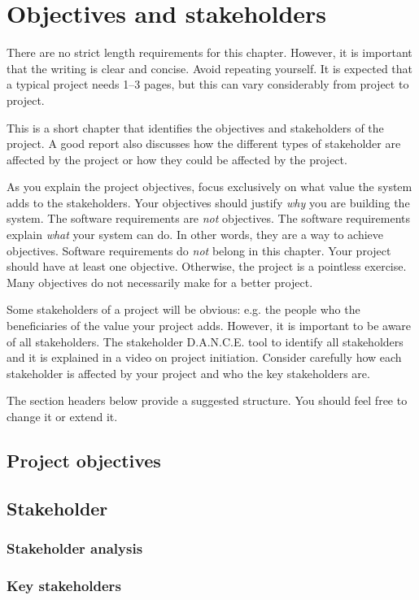 \chapter{Objectives and stakeholders}
\label{sect:objectives}


\begin{length}
There are no strict length requirements for this chapter.  However, it is important that the writing is clear and concise.  Avoid repeating yourself.  It is expected that a typical project needs 1--3 pages, but this can vary considerably from project to project.
\end{length}

\begin{expectations}
This is a short chapter that identifies the objectives and stakeholders of the project.  A good report also discusses how the different types of stakeholder are affected by the project or how they could be affected by the project.

As you explain the project objectives, focus exclusively on what value the system adds to the stakeholders.  Your objectives should justify \emph{why} you are building the system.  The software requirements are \emph{not} objectives.  The software requirements explain \emph{what} your system can do.  In other words, they are a way to achieve objectives.  Software requirements do \emph{not} belong in this chapter.  Your project should have at least one objective.  Otherwise, the project is a pointless exercise.  Many objectives do not necessarily make for a better project.

Some stakeholders of a project will be obvious: e.g. the people who the beneficiaries of the value your project adds.  However, it is important to be aware of all stakeholders.  The stakeholder D.A.N.C.E. tool to identify all stakeholders and it is explained in a video on project initiation.  Consider carefully how each stakeholder is affected by your project and who the key stakeholders are.

The section headers below provide a suggested structure.  You should feel free to change it or extend it.
\end{expectations}

\section{Project objectives}
\label{sect:objectives}

\section{Stakeholder}
\label{sect:stakeholder}

\subsection{Stakeholder analysis}
\subsection{Key stakeholders}